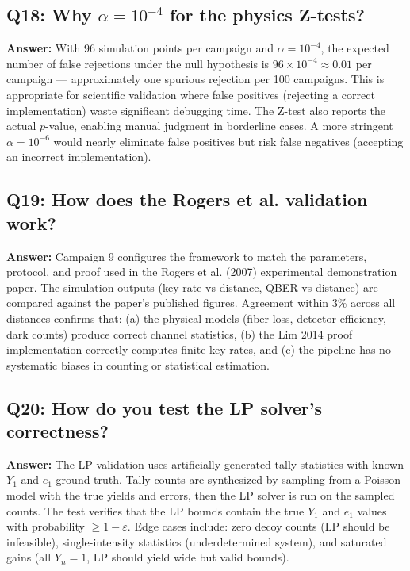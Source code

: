 \documentclass[11pt,a4paper,oneside]{report}
\begin{document}
\subsection*{Q18: Why $\alpha = 10^{-4}$ for the physics Z-tests?}
\textbf{Answer:} With 96 simulation points per campaign and $\alpha = 10^{-4}$, the expected number of false rejections under the null hypothesis is $96 \times 10^{-4} \approx 0.01$ per campaign — approximately one spurious rejection per 100 campaigns. This is appropriate for scientific validation where false positives (rejecting a correct implementation) waste significant debugging time. The Z-test also reports the actual $p$-value, enabling manual judgment in borderline cases. A more stringent $\alpha = 10^{-6}$ would nearly eliminate false positives but risk false negatives (accepting an incorrect implementation).

\subsection*{Q19: How does the Rogers et al. validation work?}
\textbf{Answer:} Campaign 9 configures the framework to match the parameters, protocol, and proof used in the Rogers et al. (2007) experimental demonstration paper. The simulation outputs (key rate vs distance, QBER vs distance) are compared against the paper's published figures. Agreement within 3\% across all distances confirms that: (a) the physical models (fiber loss, detector efficiency, dark counts) produce correct channel statistics, (b) the Lim 2014 proof implementation correctly computes finite-key rates, and (c) the pipeline has no systematic biases in counting or statistical estimation.

\subsection*{Q20: How do you test the LP solver's correctness?}
\textbf{Answer:} The LP validation uses artificially generated tally statistics with known $Y_1$ and $e_1$ ground truth. Tally counts are synthesized by sampling from a Poisson model with the true yields and errors, then the LP solver is run on the sampled counts. The test verifies that the LP bounds contain the true $Y_1$ and $e_1$ values with probability $\geq 1-\varepsilon$. Edge cases include: zero decoy counts (LP should be infeasible), single-intensity statistics (underdetermined system), and saturated gains (all $Y_n=1$, LP should yield wide but valid bounds).
\end{document}
